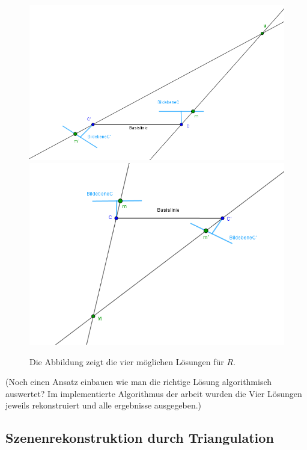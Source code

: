 \begin{figure}[!htb]
	\includegraphics[width=\linewidth]{images/P_Solution_three.png}
	\label{fig:awesome_image1}
	\endminipage\hfill
	\includegraphics[width=\linewidth]{images/P_Solution_four.png}
	\label{fig:awesome_image2}
	\endminipage\hfill
	\caption{Die Abbildung zeigt die vier möglichen Lösungen für $R$. }
\end{figure}
\pagebreak

(Noch einen Ansatz einbauen wie man die richtige Lösung algorithmisch auswertet? Im implementierte Algorithmus der arbeit wurden die Vier Lösungen jeweils rekonstruiert und alle ergebnisse ausgegeben.)

\subsection{Szenenrekonstruktion durch Triangulation}


